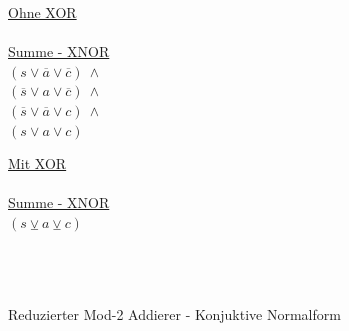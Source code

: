 \begin{figure}[!h]
\begin{minipage}[l]{3.5cm}
    \underline{Ohne XOR}\\
    ~\\
    \underline{Summe - XNOR}\\
    $ (s \vee \overline{a} \vee \overline{c}) ~ \wedge $\\
    $ (\overline{s} \vee a \vee \overline{c}) ~ \wedge $\\
    $ (\overline{s} \vee \overline{a} \vee c) ~ \wedge $\\
    $ (s \vee a \vee c) $
  \end{minipage}
  \begin{minipage}[l]{3.5cm}
    \underline{Mit XOR}\\
    ~\\
    \underline{Summe - XNOR}\\
    $ (s \veebar a \veebar c) $\\
    ~\\
    ~\\
    ~
  \end{minipage}
  \caption{Reduzierter Mod-2 Addierer - Konjuktive Normalform}
  \label{fig:red_lastadder_cnf}
\end{figure}

